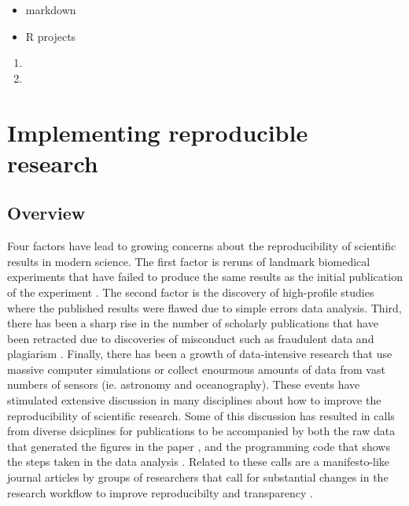 \documentclass[]{book}
\providecommand{\tightlist}{%
  \setlength{\itemsep}{0pt}\setlength{\parskip}{0pt}}
\begin{document}
\begin{itemize}
\tightlist
\item
  markdown
\item
  R projects
\end{itemize}

\begin{enumerate}
\def\labelenumi{\arabic{enumi}.}
\setcounter{enumi}{2}
\item
\item
\end{enumerate}

\chapter{Implementing reproducible
research}\label{implementing-reproducible-research}

\section{Overview}\label{overview-1}

Four factors have lead to growing concerns about the reproducibility of
scientific results in modern science. The first factor is reruns of
landmark biomedical experiments that have failed to produce the same
results as the initial publication of the experiment
\citep{Prinz2011drugtargets, Begley2012clinical}. The second factor is
the discovery of high-profile studies where the published results were
flawed due to simple errors data
analysis\citep{baggerly2009deriving, Herndon2013austerity}. Third, there
has been a sharp rise in the number of scholarly publications that have
been retracted due to discoveries of misconduct such as fraudulent data
and plagiarism \citep{Vannoorden2011retractions, Steen2013retractions}.
Finally, there has been a growth of data-intensive research that use
massive computer simulations or collect enourmous amounts of data from
vast numbers of sensors (ie. astronomy and oceanography). These events
have stimulated extensive discussion in many disciplines about how to
improve the reproducibility of scientific research. Some of this
discussion has resulted in calls from diverse dsicplines
\citep{nosek2015open} for publications to be accompanied by both the raw
data that generated the figures in the paper
\citep{reichman2011challenges}, and the programming code that shows the
steps taken in the data analysis
\citep{barnes2010publish, Ince1012opencomputer, Morin2012blackbox}.
Related to these calls are a manifesto-like journal articles by groups
of researchers that call for substantial changes in the research
workflow to improve reproducibilty and transparency
\citep{wilson2014best, Hampton2015tao, Sandve2013tenrules}.
\end{document}
